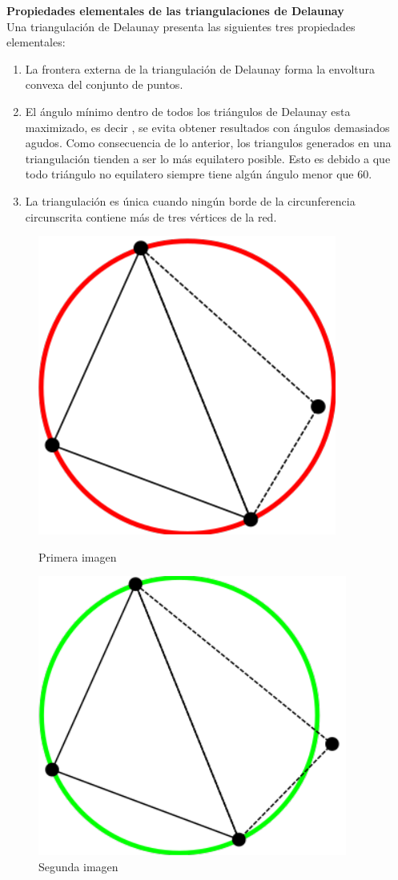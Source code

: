 \documentclass[12pt]{report}
\begin{document}
		\large{\textbf{Propiedades elementales de las triangulaciones de Delaunay}}\\

	Una triangulación de Delaunay presenta las siguientes tres propiedades elementales:
	
	\begin{enumerate}
		\item La frontera externa de la triangulación de Delaunay forma la envoltura convexa del conjunto de puntos.
		\item El ángulo mínimo dentro de todos los triángulos de Delaunay esta maximizado, es decir , se evita obtener resultados con ángulos demasiados agudos. Como consecuencia de lo anterior, los triangulos generados en una triangulación tienden a ser lo más equilatero posible. Esto  es debido a que todo triángulo no equilatero siempre tiene algún ángulo menor que 60{\degree }.
		\item La triangulación es única cuando ningún borde de la circunferencia circunscrita contiene más de tres vértices de la red. 
	
	\end{enumerate}
		

	
	\begin{figure}[h]
		\centering
		\begin{minipage}{0.45\textwidth}
			\centering
			\includegraphics[width=0.44\linewidth]{no_td.png}  %
			\caption{Primera imagen}
			
		\end{minipage}\hfill
		\begin{minipage}{0.45\textwidth}
			\centering
			\includegraphics[width=0.5\linewidth]{si_td.png}  %
			\caption{Segunda imagen}
		\end{minipage}
	\end{figure}
\end{document}
